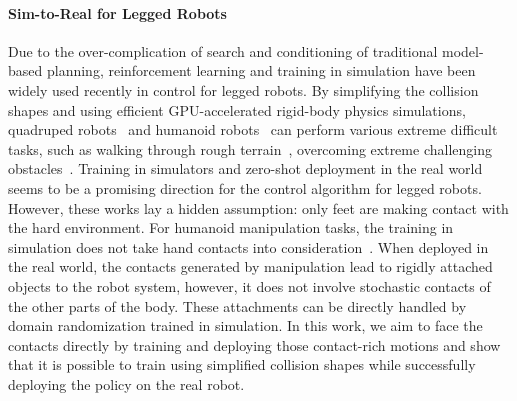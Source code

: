
\paragraph{Sim-to-Real for Legged Robots}
Due to the over-complication of search and conditioning of traditional model-based planning, reinforcement learning and training in simulation have been widely used recently in control for legged robots. By simplifying the collision shapes and using efficient GPU-accelerated rigid-body physics simulations, quadruped robots~\cite{rudin2022learning, kumar2021rma, escontrela2022adversarial} and humanoid robots~\cite{ilija2024humanoid, liao2024berkeleyhumanoid, xia2024dukehumanoid, cheng2024express, he2024learning, zhang2024wholebody, castillo2021robust} can perform various extreme difficult tasks, such as walking through rough terrain~\cite{nahrendra2023dreamwaq, agarwal2022legged, lee2020learning}, overcoming extreme challenging obstacles~\cite{david2024anymal, zhuang2023robot, cheng2023parkour, zhuang2024humanoid, long2024learninghumanoidlocomotionperceptive}. Training in simulators and zero-shot deployment in the real world seems to be a promising direction for the control algorithm for legged robots. However, these works lay a hidden assumption: only feet are making contact with the hard environment. For humanoid manipulation tasks, the training in simulation does not take hand contacts into consideration~\cite{zhang2024wococo, fu2024humanplus}. When deployed in the real world, the contacts generated by manipulation lead to rigidly attached objects to the robot system, however, it does not involve stochastic contacts of the other parts of the body. These attachments can be directly handled by domain randomization trained in simulation. In this work, we aim to face the contacts directly by training and deploying those contact-rich motions and show that it is possible to train using simplified collision shapes while successfully deploying the policy on the real robot.